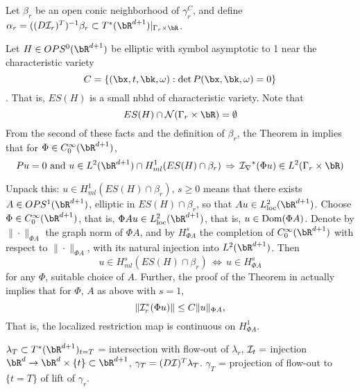 Let $\beta_r$ be an open conic neighborhood of $\gamma_r^C$, and define $\alpha_r = ((D{\cal I}_r)^T)^{-1}\beta_r \subset T^*(\bR^{d+1}) |_{\Gamma_r \times \bR}$.

Let $H \in OPS^0(\bR^{d+1})$ be elliptic with symbol asymptotic to 1 near the characteristic variety 
\begin{equation}
\label{eqn:chardef}
C = \{(\bx,t,\bk,\omega): \det P(\bx,\bk,\omega)=0\}
\end{equation}. That is,
 $ES(H)$ is a small nbhd of characteristic variety. Note that
\[ ES(H) \cap {\cal N}(\Gamma_r \times \bR) = \emptyset\]
From the second of these facts and the definition of $\beta_r$, the Theorem
in \cite{BaoSy:91b} implies that for $\Phi \in C_0^{\infty}(\bR^{d+1})$,
\begin{equation}
\label{eqn:baosymes}
Pu=0 \mbox{ and } u \in L^2(\bR^{d+1}) \cap H^1_{ml}(ES(H) \cap \beta_r) \,\Rightarrow\, {\cal I_r}^*(\Phi u) \in L^2(\Gamma_r \times \bR)
\end{equation}

Unpack this: $u \in H^1_{ml}(ES(H) \cap \beta_r),\, s \ge 0$ means that there exists $A \in OPS^1(\bR^{d+1})$, elliptic in $ES(H) \cap \beta_r$, so that $Au \in L^2_{\rm loc}(\bR^{d+1})$. Choose $\Phi \in C_0^{\infty}(\bR^{d+1})$, that is, $\Phi Au \in L^2_{\rm loc}(\bR^{d+1})$, that is, $u \in {\rm Dom}(\Phi A)$. Denote by $\| \cdot \|_{\Phi A}$ the graph norm of $\Phi A$, and by $H^s_{\Phi A}$ the completion of $C_0^{\infty}(\bR^{d+1})$ with respect to $\| \cdot \|_{\Phi A}$, with its natural injection into $L^2(\bR^{d+1})$. Then  
\[
u \in H^s_{ml}(ES(H) \cap \beta_r) \,\Leftrightarrow \, u \in H^s_{\Phi A}
\]
for any $\Phi$, suitable choice of $A$. Further, the proof of the Theorem in \cite{BaoSy:91b} actually implies that for $\Phi$, $A$ as above with $s=1$,
\[
\|{\cal I}_r^*(\Phi u)\| \le C \|u\|_{\Phi A},
\]
That is, the localized restriction map is continuous on $H^1_{\Phi A}$.

 $\lambda_T \subset T^*(\bR^{d+1})_{t=T}$ = intersection with flow-out of $\lambda_r$, ${\cal I}_t =$ injection $\bR^d \rightarrow \bR^d \times \{t\} \subset \bR^{d+1}$, $\gamma_T = (D{\cal I})^T\lambda_T$. $\gamma_T$ = projection of flow-out to $\{t=T\}$ of lift of $\gamma_r$.

